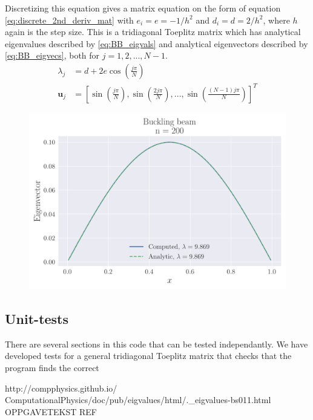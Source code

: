 \documentclass[reprint,english,notitlepage,nofootinbib]{revtex4-1}  %
\begin{document}
Discretizing this equation gives a matrix equation on the form of equation \ref{eq:discrete_2nd_deriv_mat} with $e_i = e = -1/h^2$ and $d_i = d = 2/h^2$, where $h$ again is the step size. This is a tridiagonal Toeplitz matrix which has analytical eigenvalues described by \ref{eq:BB_eigvals} and analytical eigenvectors described by \ref{eq:BB_eigvecs}, both for $j = 1, 2, ..., N-1$.
\begin{align}
  \lambda_j &= d + 2 e \cos{\left( \frac{j \pi}{N} \right)} \label{eq:BB_eigvals} \\
  \mathbf u_j &= \left[ \sin{\left( \frac{j \pi}{N} \right)}, \sin{\left( \frac{2 j \pi}{N} \right)}, ..., \sin{\left( \frac{(N-1) j \pi}{N} \right)} \right]^T \label{eq:BB_eigvecs}
\end{align}

\begin{figure}[h]
	\centering
	\includegraphics[width=\linewidth]{../output/BB_200_0.pdf}
	\label{fig:BB200}
	\caption{}
\end{figure}


\subsection{Unit-tests}

There are several sections in this code that can be tested independantly. We have developed tests for a general tridiagonal Toeplitz matrix that checks that the program finds the correct


\onecolumngrid
\begin{thebibliography}{}
 http://compphysics.github.io/
ComputationalPhysics/doc/pub/eigvalues/html/.\_eigvalues-bs011.html
 OPPGAVETEKST REF

\end{thebibliography}
\end{document}
